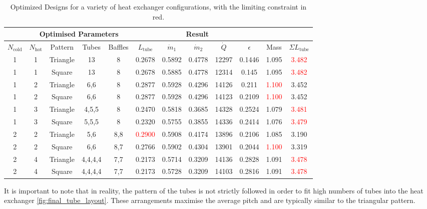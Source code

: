 \documentclass{article}
\begin{document}
\begin{table}[H]
  \centering
  \begin{tabular}{|c|c|c|c|c|c|c|c|c|c|c|c|}
      \hline
      \rowcolor{gray!30}
      \multicolumn{3}{|c|}{\textbf{Configuration}} & \multicolumn{4}{c|}{\textbf{Optimised Parameters}} & \multicolumn{5}{c|}{\textbf{Result}} \\ \hline
      \rowcolor{gray!10}
      $N_\text{cold}$ & $N_\text{hot}$ & Pattern & Tubes & Baffles & $L_\text{tube}$ & $\dot{m}_1$ & $\dot{m}_2$ & $\dot{Q}$ & $\epsilon$ & Mass & $\Sigma L_\text{tube}$ \\ \hline
      1 & 1 & Triangle & 13 & 8 & 0.2678 & 0.5892 & 0.4778 & 12297 & 0.1446 & 1.095 & \textcolor{red}{3.482} \\ \hline
      1 & 1 & Square & 13 & 8 & 0.2678 & 0.5885 & 0.4778 & 12314 & 0.145 & 1.095 & \textcolor{red}{3.482} \\ \hline
      1 & 2 & Triangle & 6,6 & 8 & 0.2877 & 0.5928 & 0.4296 & 14126 & 0.211 & \textcolor{red}{1.100} & 3.452 \\ \hline
      1 & 2 & Square & 6,6 & 8 & 0.2877 & 0.5928 & 0.4296 & 14123 & 0.2109 & \textcolor{red}{1.100} & 3.452 \\ \hline
      \rowcolor{yellow!60}
      1 & 3 & Triangle & 4,5,5 & 8 & 0.2470 & 0.5818 & 0.3685 & 14328 & 0.2524 & 1.079 & \textcolor{red}{3.481} \\ \hline
      1 & 3 & Square & 5,5,5 & 8 & 0.2320 & 0.5755 & 0.3855 & 14336 & 0.2414 & 1.076 & \textcolor{red}{3.479} \\ \hline
      2 & 2 & Triangle & 5,6 & 8,8 & \textcolor{red}{0.2900} & 0.5908 & 0.4174 & 13896 & 0.2106 & 1.085 & 3.190 \\ \hline
      2 & 2 & Square & 6,6 & 8,7 & 0.2766 & 0.5902 & 0.4304 & 13901 & 0.2044 & \textcolor{red}{1.100} & 3.319 \\ \hline
      2 & 4 & Triangle & 4,4,4,4 & 7,7 & 0.2173 & 0.5714 & 0.3209 & 14136 & 0.2828 & 1.091 & \textcolor{red}{3.478} \\ \hline
      2 & 4 & Square & 4,4,4,4 & 7,7 & 0.2173 & 0.5728 & 0.3209 & 14103 & 0.2816 & 1.091 & \textcolor{red}{3.478} \\ \hline
  \end{tabular}
  \caption{Optimized Designs for a variety of heat exchanger configurations, with the limiting constraint in red.}
  \label{table:designs}
\end{table}

It is important to note that in reality, the pattern of the tubes is not strictly followed in order to fit high numbers of tubes into the heat exchanger \ref{fig:final_tube_layout}.
These arrangements maximise the average pitch and are typically similar to the triangular pattern.
\end{document}

